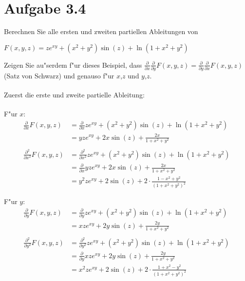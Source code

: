 \documentclass{theozettel}
\begin{document}
\section*{Aufgabe 3.4}Berechnen Sie alle ersten und zweiten partiellen Ableitungen von
\begin{center}
$F\left(x,y,z\right)=ze^{xy}+\left(x^2+y^2\right)\sin\left(z\right)+\ln\left(1+x^2+y^2\right)$
\end{center}
Zeigen Sie au"serdem f"ur dieses Beispiel, dass $\frac{\partial}{\partial x}\frac{\partial}{\partial y}F\left(x,y,z\right) =\frac{\partial}{\partial y}\frac{\partial}{\partial x}F\left(x,y,z\right)$ (Satz von Schwarz) und genauso f"ur $x$,$z$ und $y$,$z$.\\\\
Zuerst die erste und zweite partielle Ableitung:\\\\
F"ur $x$:\\
\begin{align*}
\frac{\partial}{\partial x}F\left(x,y,z\right) &=\frac{\partial}{\partial x}ze^{xy}+\left(x^2+y^2\right)\sin\left(z\right)+\ln\left(1+x^2+y^2\right)\\
&=yze^{xy}+2x\sin\left(z\right)+\frac{2x}{1+x^2+y^2}\\\\
\frac{\partial^2}{\partial x^2}F\left(x,y,z\right) &=\frac{\partial^2}{\partial x^2}ze^{xy}+\left(x^2+y^2\right)\sin\left(z\right)+\ln\left(1+x^2+y^2\right)\\
&=\frac{\partial}{\partial x}yze^{xy}+2x\sin\left(z\right)+\frac{2x}{1+x^2+y^2}\\
&= y^2 z e^{xy}+2\sin\left(z\right) +2 \cdot\frac{1-x^2+y^2}{\left(1+x^2+y^2\right)^2}
\end{align*}

F"ur $y$:\\
\begin{align*}
\frac{\partial}{\partial y}F\left(x,y,z\right) &=\frac{\partial}{\partial y}ze^{xy}+\left(x^2+y^2\right)\sin\left(z\right)+\ln\left(1+x^2+y^2\right)\\
&=xze^{xy}+2y\sin\left(z\right)+\frac{2y}{1+x^2+y^2}\\\\
\frac{\partial^2}{\partial y^2}F\left(x,y,z\right) &=\frac{\partial^2}{\partial y^2}ze^{xy}+\left(x^2+y^2\right)\sin\left(z\right)+\ln\left(1+x^2+y^2\right)\\
&=\frac{\partial}{\partial y}xze^{xy}+2y\sin\left(z\right)+\frac{2y}{1+x^2+y^2}\\
&= x^2 z e^{xy}+2\sin\left(z\right) +2 \cdot\frac{1+x^2-y^2}{\left(1+x^2+y^2\right)^2}
\end{align*}
\end{document}

